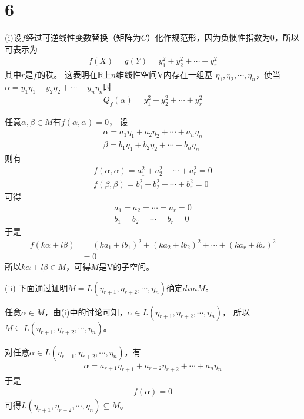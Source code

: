 \documentclass{article}
\begin{document}
\section*{6}

 (i)设$f$经过可逆线性变数替换（矩阵为$C$）化作规范形，因为负惯性指数为0，所以可表示为
\begin{align*}
  f(X) = g(Y) = y_1^2 + y_2^2 + \cdots + y_r^2
\end{align*}
其中$r$是$f$的秩。
这表明在$\mathbb{R}$上$n$维线性空间V内存在一组基
$\eta_1, \eta_2, \cdots, \eta_n$，使当$\alpha = y_1 \eta_1 + y_2 \eta_2 + \cdots + y_n \eta_n$时
\begin{align*}
  Q_f(\alpha) = y_1^2 + y_2^2 + \cdots + y_r^2
\end{align*}

任意$\alpha, \beta \in M$有$f(\alpha, \alpha) = 0$，
设
\begin{align*}
  \alpha = a_1 \eta_1 + a_2 \eta_2 + \cdots + a_n \eta_n \\
  \beta = b_1 \eta_1 + b_2 \eta_2 + \cdots + b_n \eta_n
\end{align*}
则有
\begin{align*}
  f(\alpha, \alpha) = a_1^2 + a_2^2 + \cdots + a_r^2 = 0 \\
  f(\beta, \beta) = b_1^2 + b_2^2 + \cdots + b_r^2 = 0
\end{align*}
可得
\begin{align*}
  a_1 = a_2 = \cdots = a_r = 0 \\
  b_1 = b_2 = \cdots = b_r = 0
\end{align*}
于是
\begin{align*}
  f(k\alpha + l\beta)
   & = (k a_1 + l b_1)^2 + (k a_2 + l b_2)^2 + \cdots + (k a_r + l b_r)^2 \\
   & = 0
\end{align*}
所以$k \alpha + l \beta \in M$，可得$M$是V的子空间。

(ii) 下面通过证明$M = L(\eta_{r+1}, \eta_{r+2}, \cdots, \eta_n)$确定$dim M$。

任意$\alpha \in M$，由(i)中的讨论可知，$\alpha \in L(\eta_{r+1}, \eta_{r+2}, \cdots, \eta_n)$，
所以$M \subseteq L(\eta_{r+1}, \eta_{r+2}, \cdots, \eta_n)$。

对任意$\alpha \in L(\eta_{r+1}, \eta_{r+2}, \cdots, \eta_n)$，有
\begin{align*}
  \alpha = a_{r+1} \eta_{r+1} + a_{r+2} \eta_{r+2} + \cdots + a_n \eta_n
\end{align*}
于是
\begin{align*}
  f(\alpha) = 0
\end{align*}
可得$L(\eta_{r+1}, \eta_{r+2}, \cdots, \eta_n) \subseteq M$。
\end{document}
